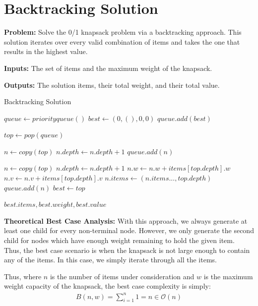 \documentclass{article}
\begin{document}
\pagebreak
\section{Backtracking Solution}

\textbf{Problem:}
Solve the 0/1 knapsack problem via a backtracking approach.
This solution iterates over every valid combination of items and takes the one that results in the highest value.

\textbf{Inputs:}
The set of items and the maximum weight of the knapsack.

\textbf{Outputs:}
The solution items, their total weight, and their total value.

\FloatBarrier
\begin{algorithm}
\caption{Backtracking Solution}
\begin{algorithmic}[1]
	\State $queue \gets priorityqueue()$
	\State $best \gets (0, (), 0, 0)$
	\State $queue.add(best)$

		\State $top \gets pop(queue)$

			\State $n \gets copy(top)$
			\State $n.depth \gets n.depth + 1$
			\State $queue.add(n)$

				\State $n \gets copy(top)$
				\State $n.depth \gets n.depth + 1$
				\State $n.w \gets n.w + items[top.depth].w$
				\State $n.v \gets n.v + items[top.depth].v$
				\State $n.items \gets (n.items..., top.depth)$
				\State $queue.add(n)$
			\EndIf
		\Else
				\State $best \gets top$
			\EndIf
		\EndIf
	\EndWhile

	\Return $best.items, best.weight, best.value$
\EndFunction
\end{algorithmic}
\end{algorithm}
\FloatBarrier

\textbf{Theoretical Best Case Analysis:}
With this approach, we always generate at least one child for every non-terminal node.
However, we only generate the second child for nodes which have enough weight remaining to hold the given item.
Thus, the best case scenario is when the knapsack is not large enough to contain any of the items.
In this case, we simply iterate through all the items.

Thus, where $n$ is the number of items under consideration and $w$ is the maximum weight capacity of the knapsack, the best case complexity is simply:
\begin{align}
B(n, w) = \sum_{i=1}^n{1} = n \in \mathcal{O}(n)
\end{align}
\end{document}
